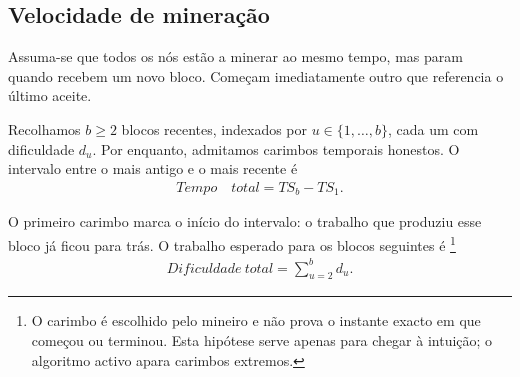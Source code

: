 \subsection{Velocidade de mineração}
Assuma-se que todos os nós estão a minerar ao mesmo tempo, mas param quando
recebem um novo bloco. Começam imediatamente outro que referencia o último
aceite.


Recolhamos $b\geq2$ blocos recentes, indexados por $u\in\{1,\ldots,b\}$, cada um
com dificuldade $d_u$. Por enquanto, admitamos carimbos temporais honestos. O
intervalo entre o mais antigo e o mais recente é
\begin{align*}
Tempo\hspace{1em}total = {TS}_b - {TS}_1 .  
\end{align*}

O primeiro carimbo marca o início do intervalo: o trabalho que produziu esse
bloco já ficou para trás. O trabalho esperado para os blocos seguintes é
\footnote{O carimbo é escolhido pelo mineiro e não prova o instante exacto em
que começou ou terminou. Esta hipótese serve apenas para chegar à intuição; o
algoritmo activo apara carimbos extremos.}
\begin{align*}
Dificuldade\ total = \sum_{u=2}^b d_u .
\end{align*}


